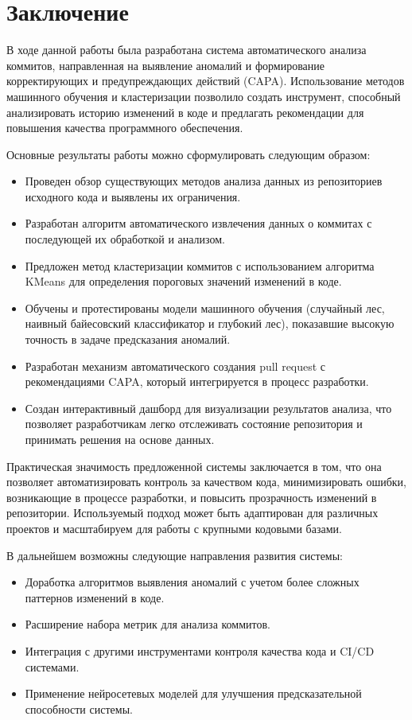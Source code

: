 \chapter*{Заключение} \label{ch-conclusion}

В ходе данной работы была разработана система автоматического анализа коммитов, направленная на выявление аномалий и формирование корректирующих и предупреждающих действий (CAPA). Использование методов машинного обучения и кластеризации позволило создать инструмент, способный анализировать историю изменений в коде и предлагать рекомендации для повышения качества программного обеспечения.

Основные результаты работы можно сформулировать следующим образом:
\begin{itemize}
	\item Проведен обзор существующих методов анализа данных из репозиториев исходного кода и выявлены их ограничения.
	\item Разработан алгоритм автоматического извлечения данных о коммитах с последующей их обработкой и анализом.
	\item Предложен метод кластеризации коммитов с использованием алгоритма KMeans для определения пороговых значений изменений в коде.
	\item Обучены и протестированы модели машинного обучения (случайный лес, наивный байесовский классификатор и глубокий лес), показавшие высокую точность в задаче предсказания аномалий.
	\item Разработан механизм автоматического создания pull request с рекомендациями CAPA, который интегрируется в процесс разработки.
	\item Создан интерактивный дашборд для визуализации результатов анализа, что позволяет разработчикам легко отслеживать состояние репозитория и принимать решения на основе данных.
\end{itemize}

Практическая значимость предложенной системы заключается в том, что она позволяет автоматизировать контроль за качеством кода, минимизировать ошибки, возникающие в процессе разработки, и повысить прозрачность изменений в репозитории. Используемый подход может быть адаптирован для различных проектов и масштабируем для работы с крупными кодовыми базами.

В дальнейшем возможны следующие направления развития системы:
\begin{itemize}
	\item Доработка алгоритмов выявления аномалий с учетом более сложных паттернов изменений в коде.
	\item Расширение набора метрик для анализа коммитов.
	\item Интеграция с другими инструментами контроля качества кода и CI/CD системами.
	\item Применение нейросетевых моделей для улучшения предсказательной способности системы.
\end{itemize}

